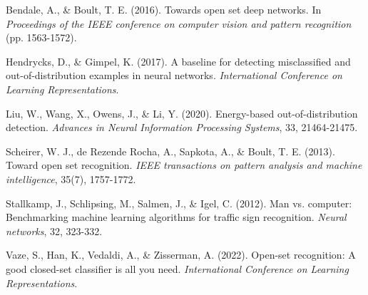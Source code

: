 \documentclass[11pt, a4paper]{article}
\begin{document}

\begin{thebibliography}{9}

Bendale, A., \& Boult, T. E. (2016). Towards open set deep networks. In \textit{Proceedings of the IEEE conference on computer vision and pattern recognition} (pp. 1563-1572).

Hendrycks, D., \& Gimpel, K. (2017). A baseline for detecting misclassified and out-of-distribution examples in neural networks. \textit{International Conference on Learning Representations}.

Liu, W., Wang, X., Owens, J., \& Li, Y. (2020). Energy-based out-of-distribution detection. \textit{Advances in Neural Information Processing Systems}, 33, 21464-21475.

Scheirer, W. J., de Rezende Rocha, A., Sapkota, A., \& Boult, T. E. (2013). Toward open set recognition. \textit{IEEE transactions on pattern analysis and machine intelligence}, 35(7), 1757-1772.

Stallkamp, J., Schlipsing, M., Salmen, J., \& Igel, C. (2012). Man vs. computer: Benchmarking machine learning algorithms for traffic sign recognition. \textit{Neural networks}, 32, 323-332.

Vaze, S., Han, K., Vedaldi, A., \& Zisserman, A. (2022). Open-set recognition: A good closed-set classifier is all you need. \textit{International Conference on Learning Representations}.

\end{thebibliography}
\end{document}
